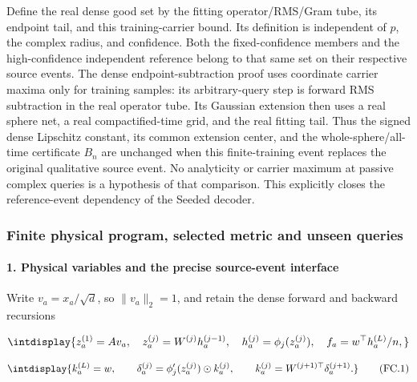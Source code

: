 
Define the real dense good set by the fitting operator/RMS/Gram tube, its endpoint tail, and this training-carrier bound. Its definition is independent of \(p\), the complex radius, and confidence. Both the fixed-confidence members and the high-confidence independent reference belong to that same set on their respective source events. The dense endpoint-subtraction proof uses coordinate carrier maxima only for training samples: its arbitrary-query step is forward RMS subtraction in the real operator tube. Its Gaussian extension then uses a real sphere net, a real compactified-time grid, and the real fitting tail. Thus the signed dense Lipschitz constant, its common extension center, and the whole-sphere/all-time certificate \(B_n\) are unchanged when this finite-training event replaces the original qualitative source event. No analyticity or carrier maximum at passive complex queries is a hypothesis of that comparison. This explicitly closes the reference-event dependency of the Seeded decoder.


\subsubsection{Finite physical program, selected metric and unseen queries}
\label{int:decoder-finite-construction}

\paragraph{1. Physical variables and the precise source-event interface}

\mbox{}\par\smallskip


Write \(v_a=x_a/\sqrt d\), so \(\|v_a\|_2=1\), and retain the dense forward and backward recursions


\begingroup\renewcommand{\theHequation}{intdisplay.690}
\begin{equation*}
\intdisplay{
z_a^{(1)}=Av_a,\quad z_a^{(j)}=W^{(j)}h_a^{(j-1)},\quad
h_a^{(j)}=\phi_j(z_a^{(j)}),\quad f_a=w^\top h_a^{(L)}/n,
}
\end{equation*}
\endgroup

\begingroup\renewcommand{\theHequation}{intdisplay.691}
\begin{equation}
\intdisplay{
k_a^{(L)}=w,\qquad
\delta_a^{(j)}=\phi_j'(z_a^{(j)})\odot k_a^{(j)},\qquad
k_a^{(j)}=W^{(j+1)\top}\delta_a^{(j+1)}.
}
\tag{FC.1}
\label{int:eq-0306-fc-1}
\end{equation}
\endgroup

